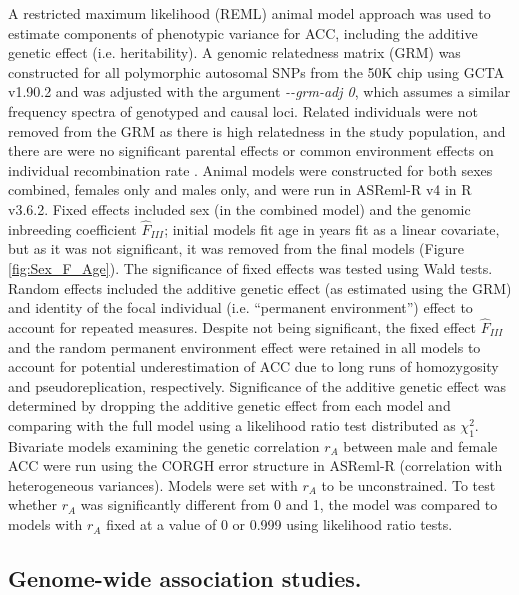 \documentclass[a4paper,11pt]{article}
\begin{document}
A restricted maximum likelihood (REML) animal model approach \citep{Henderson1975} was used to estimate components of phenotypic variance for ACC, including the additive genetic effect (i.e. heritability). A genomic relatedness matrix (GRM) was constructed for all polymorphic autosomal SNPs from the 50K chip using GCTA v1.90.2 \citep{Yang2011} and was adjusted with the argument \textit{{-}{-}grm-adj 0}, which assumes a similar frequency spectra of genotyped and causal loci. Related individuals were not removed from the GRM as there is high relatedness in the study population, and there are were no significant parental effects or common environment effects on individual recombination rate \citep{Johnston2016}. Animal models were constructed for both sexes combined, females only and males only, and were run in ASReml-R v4 \citep{Butler2009} in R v3.6.2. Fixed effects included sex (in the combined model) and the genomic inbreeding coefficient $\hat{F}_{III}$; initial models fit age in years fit as a linear covariate, but as it was not significant, it was removed from the final models (Figure \ref{fig:Sex_F_Age}). The significance of fixed effects was tested using Wald tests. Random effects included the additive genetic effect (as estimated using the GRM) and identity of the focal individual (i.e. ``permanent environment'') effect to account for repeated measures. Despite not being significant, the fixed effect $\hat{F}_{III}$ and the random permanent environment effect were retained in all models to account for potential underestimation of ACC due to long runs of homozygosity and pseudoreplication, respectively. Significance of the additive genetic effect was determined by dropping the additive genetic effect from each model and comparing with the full model using a likelihood ratio test distributed as $\chi^{2}_{1}$. Bivariate models examining the genetic correlation $r_{A}$ between male and female ACC were run using the CORGH error structure in ASReml-R (correlation with heterogeneous variances). Models were set with $r_{A}$ to be unconstrained. To test whether $r_{A}$ was significantly different from 0 and 1, the model was compared to models with $r_{A}$ fixed at a value of 0 or 0.999 using likelihood ratio tests.  

\subsection*{Genome-wide association studies.}
\end{document}
